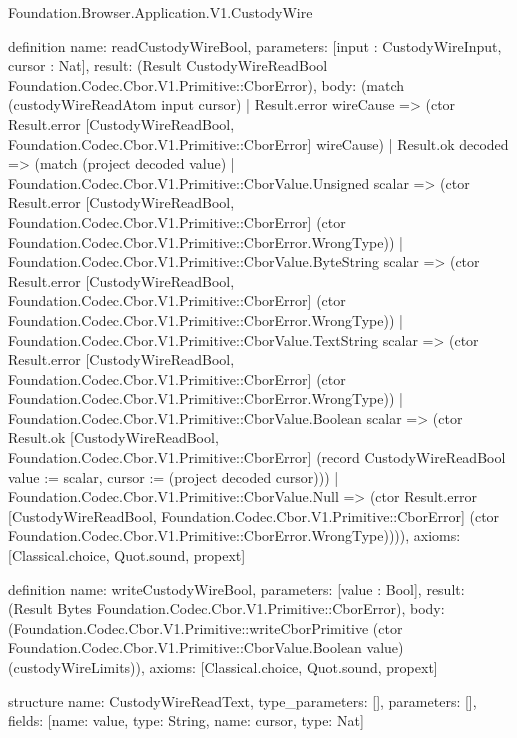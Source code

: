 \begin{lexlean}{Foundation.Browser.Application.V1.CustodyWire}
\begin{semanticmodule}
definition{
  name: readCustodyWireBool,
  parameters: [input : CustodyWireInput, cursor : Nat],
  result: (Result CustodyWireReadBool Foundation.Codec.Cbor.V1.Primitive::CborError),
  body: (match (custodyWireReadAtom input cursor)
    | Result.error wireCause => (ctor Result.error [CustodyWireReadBool, Foundation.Codec.Cbor.V1.Primitive::CborError] wireCause)
    | Result.ok decoded => (match (project decoded value)
      | Foundation.Codec.Cbor.V1.Primitive::CborValue.Unsigned scalar => (ctor Result.error [CustodyWireReadBool, Foundation.Codec.Cbor.V1.Primitive::CborError] (ctor Foundation.Codec.Cbor.V1.Primitive::CborError.WrongType))
      | Foundation.Codec.Cbor.V1.Primitive::CborValue.ByteString scalar => (ctor Result.error [CustodyWireReadBool, Foundation.Codec.Cbor.V1.Primitive::CborError] (ctor Foundation.Codec.Cbor.V1.Primitive::CborError.WrongType))
      | Foundation.Codec.Cbor.V1.Primitive::CborValue.TextString scalar => (ctor Result.error [CustodyWireReadBool, Foundation.Codec.Cbor.V1.Primitive::CborError] (ctor Foundation.Codec.Cbor.V1.Primitive::CborError.WrongType))
      | Foundation.Codec.Cbor.V1.Primitive::CborValue.Boolean scalar => (ctor Result.ok [CustodyWireReadBool, Foundation.Codec.Cbor.V1.Primitive::CborError] (record CustodyWireReadBool {value := scalar, cursor := (project decoded cursor)}))
      | Foundation.Codec.Cbor.V1.Primitive::CborValue.Null => (ctor Result.error [CustodyWireReadBool, Foundation.Codec.Cbor.V1.Primitive::CborError] (ctor Foundation.Codec.Cbor.V1.Primitive::CborError.WrongType)))),
  axioms: [Classical.choice, Quot.sound, propext]
}

definition{
  name: writeCustodyWireBool,
  parameters: [value : Bool],
  result: (Result Bytes Foundation.Codec.Cbor.V1.Primitive::CborError),
  body: (Foundation.Codec.Cbor.V1.Primitive::writeCborPrimitive (ctor Foundation.Codec.Cbor.V1.Primitive::CborValue.Boolean value) (custodyWireLimits)),
  axioms: [Classical.choice, Quot.sound, propext]
}

structure{
  name: CustodyWireReadText,
  type_parameters: [],
  parameters: [],
  fields: [{name: value, type: String}, {name: cursor, type: Nat}]
}


\end{semanticmodule}
\end{lexlean}
